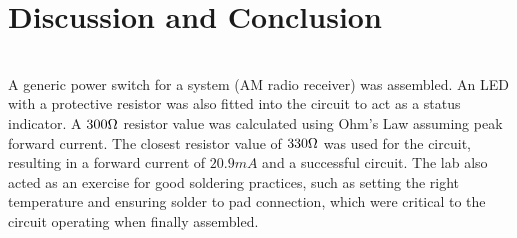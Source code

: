 \documentclass[journal]{IEEEtran}
\begin{document}
\section{Discussion and Conclusion}\\

\noindent A generic power switch for a system (AM radio receiver) was assembled. An LED with a protective resistor was also fitted into the circuit to act as a status indicator. A $300 \ohm$ resistor value was calculated using Ohm's Law assuming peak forward current. The closest resistor value of $330 \ohm$ was used for the circuit, resulting in a forward current of $20.9mA$ and a successful circuit. The lab also acted as an exercise for good soldering practices, such as setting the right temperature and ensuring solder to pad connection, which were critical to the circuit operating when finally assembled. 




\printbibliography
\end{document}
